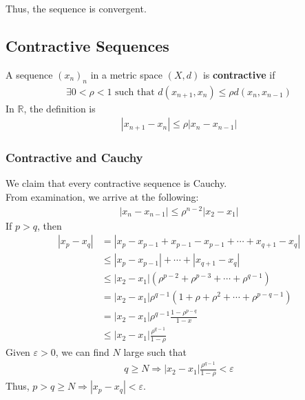 \documentclass[10pt]{extarticle}
\newcommand{\R}{\mathbb{R}}
\begin{document}
    Thus, the sequence is convergent.
  \subsection{Contractive Sequences}%
    A sequence $(x_n)_n$ in a metric space $(X,d)$ is \textbf{contractive} if
    \begin{align*}
      \exists 0 < \rho < 1 \text{ such that } d(x_{n+1},x_n) \leq \rho d(x_{n},x_{n-1}) \tag*{$\forall n\geq 1$}
    \end{align*}
    In $\R$, the definition is
    \begin{align*}
      |x_{n+1}-x_n| \leq \rho |x_n - x_{n-1}|
    \end{align*}
    \subsubsection{Contractive and Cauchy}%
    We claim that every contractive sequence is Cauchy.\\

    From examination, we arrive at the following:
    \begin{align*}
      |x_{n} - x_{n-1}| \leq \rho^{n-2}|x_{2}-x_{1}| \tag*{($\ast$)}
    \end{align*}
    If $p > q$, then
    \begin{align*}
      |x_{p}-x_{q}| &= |x_{p}-x_{p-1} + x_{p-1}-x_{p-1} + \cdots + x_{q+1}-x_q|\\
                    &\leq |x_p-x_{p-1}| + \cdots + |x_{q+1}-x_q|\tag*{Triangle Inequality}\\
                    &\leq |x_2-x_1| \left(\rho^{p-2} + \rho^{p-3} + \cdots + \rho^{q-1}\right)\\
                    &= |x_2-x_1| \rho^{q-1} \left(1 + \rho + \rho^2 + \cdots + \rho^{p-q-1}\right)\\
                    &= |x_2-x_1|\rho^{q-1}\frac{1-\rho^{p-q}}{1-x}\tag*{Finite Geometric Sequence}\\
                    &\leq |x_2 - x_1| \frac{\rho^{q-1}}{1-\rho}
    \end{align*}
    Given $\varepsilon > 0$, we can find $N$ large such that 
    \begin{align*}
      q\geq N \Rightarrow |x_2-x_1| \frac{\rho^{q-1}}{1-\rho} < \varepsilon
    \end{align*}
    Thus, $p > q \geq N \Rightarrow |x_p-x_q| < \varepsilon$.
\end{document}
